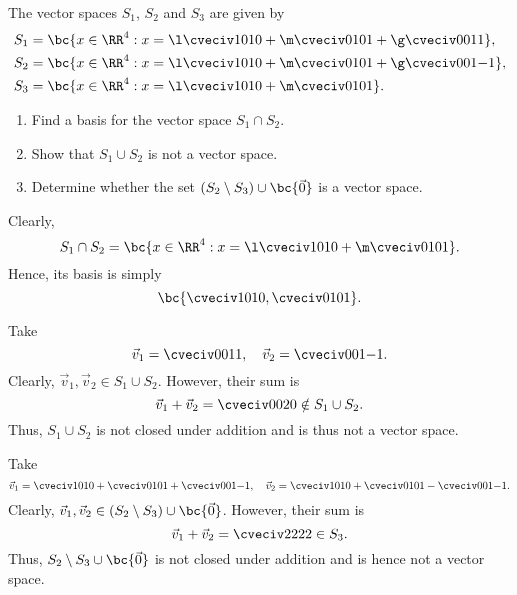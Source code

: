 \begin{problem}
    The vector spaces $S_1$, $S_2$ and $S_3$ are given by
    \begin{align*}
        S_1 &= \bc{x \in \RR^4 : x = \l \cveciv1010 + \m \cveciv0101 + \g \cveciv0011},\\
        S_2 &= \bc{x \in \RR^4 : x = \l \cveciv1010 + \m \cveciv0101 + \g \cveciv001{-1}},\\
        S_3 &= \bc{x \in \RR^4 : x = \l \cveciv1010 + \m \cveciv0101}.
    \end{align*}
    
    \begin{enumerate}
        \item Find a basis for the vector space $S_1 \cap S_2$.
        \item Show that $S_1 \cup S_2$ is not a vector space.
        \item Determine whether the set $(S_2 \setminus S_3) \cup \bc{\vec 0}$ is a vector space.
    \end{enumerate}
\end{problem}
\begin{solution}
    \begin{ppart}
        Clearly, \[S_1 \cap S_2 = \bc{x \in \RR^4 : x = \l \cveciv1010 + \m \cveciv0101}.\] Hence, its basis is simply \[\bc{\cveciv1010, \cveciv0101}.\]
    \end{ppart}
    \begin{ppart}
        Take \[\vec v_1 = \cveciv0011, \quad \vec v_2 = \cveciv001{-1}.\] Clearly, $\vec v_1, \vec v_2 \in S_1 \cup S_2$. However, their sum is \[\vec v_1 + \vec v_2 = \cveciv002{0} \notin S_1 \cup S_2.\] Thus, $S_1 \cup S_2$ is not closed under addition and is thus not a vector space.
    \end{ppart}
    \begin{ppart}
        Take \[\vec v_1 = \cveciv1010 + \cveciv0101 + \cveciv001{-1}, \quad \vec v_2 = \cveciv1010 + \cveciv0101 - \cveciv001{-1}.\] Clearly, $\vec v_1, \vec v_2 \in (S_2 \setminus S_3) \cup \bc{\vec 0}$. However, their sum is \[\vec v_1 + \vec v_2 = \cveciv2222 \in S_3.\] Thus, $S_2 \setminus S_3 \cup \bc{\vec 0}$ is not closed under addition and is hence not a vector space.
    \end{ppart}
\end{solution}

